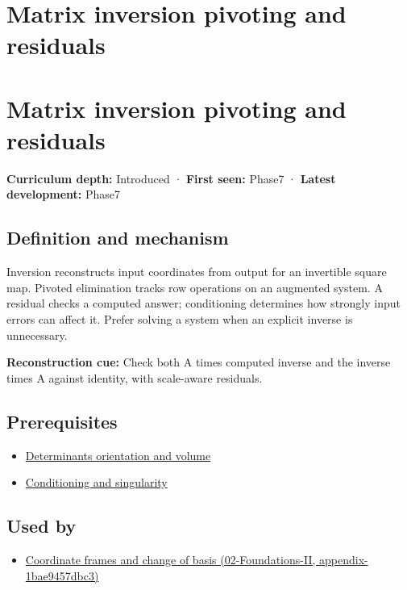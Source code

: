 \hypertarget{appendix-48d2e66378ab}{}
\section*{Matrix inversion pivoting and residuals}
\section{Matrix inversion pivoting and residuals}\label{appendix-48d2e66378ab-matrix-inversion-pivoting-and-residuals}

\textbf{Curriculum depth:} Introduced · \textbf{First seen:} Phase7 · \textbf{Latest development:} Phase7

\subsection{Definition and mechanism}\label{appendix-48d2e66378ab-definition-and-mechanism}

Inversion reconstructs input coordinates from output for an invertible square map. Pivoted elimination tracks row operations on an augmented system. A residual checks a computed answer; conditioning determines how strongly input errors can affect it. Prefer solving a system when an explicit inverse is unnecessary.

\textbf{Reconstruction cue:} Check both A times computed inverse and the inverse times A against identity, with scale-aware residuals.

\subsection{Prerequisites}\label{appendix-48d2e66378ab-prerequisites}

\begin{itemize}
\tightlist
\item
  \hyperref[appendix-da478be01d02]{Determinants orientation and volume}
\item
  \hyperref[appendix-8f6a01f284a7]{Conditioning and singularity}
\end{itemize}

\subsection{Used by}\label{appendix-48d2e66378ab-used-by}

\begin{itemize}
\tightlist
\item
  \href{../02-Foundations-II/main.pdf\#nameddest=appendix-1bae9457dbc3}{Coordinate frames and change of basis (02-Foundations-II, appendix-1bae9457dbc3)}
\end{itemize}

